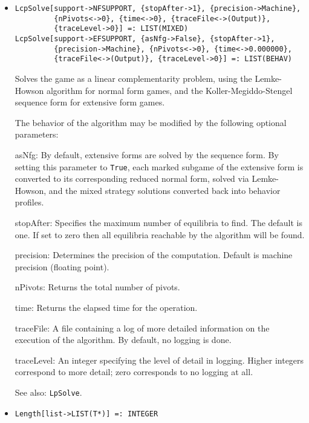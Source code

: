 \begin{itemize}




\item{}
\protect \large \begin{verbatim}
LcpSolve[support->NFSUPPORT, {stopAfter->1}, {precision->Machine}, 
         {nPivots<->0}, {time<->0}, {traceFile<->(Output)}, 
         {traceLevel->0}] =: LIST(MIXED) 
LcpSolve[support->EFSUPPORT, {asNfg->False}, {stopAfter->1}, 
         {precision->Machine}, {nPivots<->0}, {time<->0.000000}, 
         {traceFile<->(Output)}, {traceLevel->0}] =: LIST(BEHAV) 
\end{verbatim}\normalsize

\bd
Solves the game as a linear complementarity problem, using the
Lemke-Howson algorithm for normal form games, and the
Koller-Megiddo-Stengel sequence form for extensive form games.  


The behavior of the algorithm may be modified by the following
optional parameters:
\bd
\item
[asNfg:] By default, extensive forms are solved by the sequence form.
By setting this parameter to \verb+True+, each marked subgame of the extensive
form is converted to its corresponding reduced normal form, solved
via Lemke-Howson, and the mixed strategy solutions converted back into
behavior profiles.
\item
[stopAfter:] Specifies the maximum number of equilibria to find.  The
default is one. If set to zero then all equilibria reachable by the
algorithm will be found.
\item
[precision:] Determines the precision of the computation. Default is
machine precision (floating point). 
\item
[nPivots:] Returns the total number of pivots. 
\item
[time:] Returns the elapsed time for the operation.
\item
[traceFile:] A file containing a log of more detailed information on the
execution of the algorithm.  By default, no logging is done.
\item
[traceLevel:] An integer specifying the level of detail in logging.
Higher integers correspond to more detail; zero corresponds to no
logging at all.
\ed
\item [See also:] \verb+LpSolve+.
\ed

\item{}
\protect \large \begin{verbatim}
Length[list->LIST(T*)] =: INTEGER 
\end{verbatim}\normalsize


\end{itemize}
